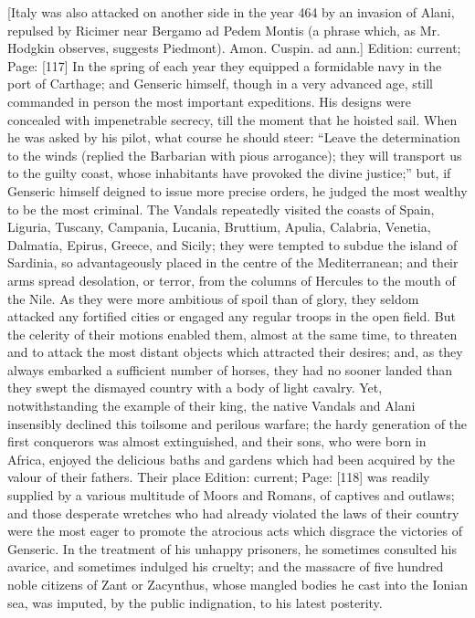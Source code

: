 {[Italy was also attacked on another side in the year 464 by an invasion of Alani, repulsed by Ricimer near Bergamo ad Pedem Montis (a phrase which, as Mr. Hodgkin observes, suggests Piedmont). Amon. Cuspin. ad ann.]} Edition: current; Page: [117] In the spring of each year they equipped a formidable navy in the port of Carthage; and Genseric himself, though in a very advanced age, still commanded in person the most important expeditions. His designs were concealed with impenetrable secrecy, till the moment that he hoisted sail. When he was asked by his pilot, what course he should steer: \texthebrew{“}Leave the determination to the winds (replied the Barbarian with pious arrogance); they will transport us to the guilty coast, whose inhabitants have provoked the divine justice;\texthebrew{}” but, if Genseric himself deigned to issue more precise orders, he judged the most wealthy to be the most criminal. The Vandals repeatedly visited the coasts of Spain, Liguria, Tuscany, Campania, Lucania, Bruttium, Apulia, Calabria, Venetia, Dalmatia, Epirus, Greece, and Sicily; they were tempted to subdue the island of Sardinia, so advantageously placed in the centre of the Mediterranean; and their arms spread desolation, or terror, from the columns of Hercules to the mouth of the Nile. As they were more ambitious of spoil than of glory, they seldom attacked any fortified cities or engaged any regular troops in the open field. But the celerity of their motions enabled them, almost at the same time, to threaten and to attack the most distant objects which attracted their desires; and, as they always embarked a sufficient number of horses, they had no sooner landed than they swept the dismayed country with a body of light cavalry. Yet, notwithstanding the example of their king, the native Vandals and Alani insensibly declined this toilsome and perilous warfare; the hardy generation of the first conquerors was almost extinguished, and their sons, who were born in Africa, enjoyed the delicious baths and gardens which had been acquired by the valour of their fathers. Their place Edition: current; Page: [118] was readily supplied by a various multitude of Moors and Romans, of captives and outlaws; and those desperate wretches who had already violated the laws of their country were the most eager to promote the atrocious acts which disgrace the victories of Genseric. In the treatment of his unhappy prisoners, he sometimes consulted his avarice, and sometimes indulged his cruelty; and the massacre of five hundred noble citizens of Zant or Zacynthus, whose mangled bodies he cast into the Ionian sea, was imputed, by the public indignation, to his latest posterity.

